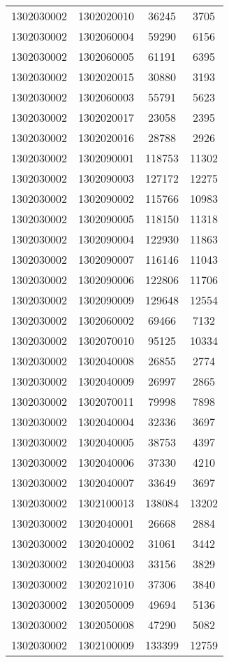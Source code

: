\begin{longtable}{llcc}
1302030002 & 1302020010 & 36245 & 3705\\
1302030002 & 1302060004 & 59290 & 6156\\
1302030002 & 1302060005 & 61191 & 6395\\
1302030002 & 1302020015 & 30880 & 3193\\
1302030002 & 1302060003 & 55791 & 5623\\
1302030002 & 1302020017 & 23058 & 2395\\
1302030002 & 1302020016 & 28788 & 2926\\
1302030002 & 1302090001 & 118753 & 11302\\
1302030002 & 1302090003 & 127172 & 12275\\
1302030002 & 1302090002 & 115766 & 10983\\
1302030002 & 1302090005 & 118150 & 11318\\
1302030002 & 1302090004 & 122930 & 11863\\
1302030002 & 1302090007 & 116146 & 11043\\
1302030002 & 1302090006 & 122806 & 11706\\
1302030002 & 1302090009 & 129648 & 12554\\
1302030002 & 1302060002 & 69466 & 7132\\
1302030002 & 1302070010 & 95125 & 10334\\
1302030002 & 1302040008 & 26855 & 2774\\
1302030002 & 1302040009 & 26997 & 2865\\
1302030002 & 1302070011 & 79998 & 7898\\
1302030002 & 1302040004 & 32336 & 3697\\
1302030002 & 1302040005 & 38753 & 4397\\
1302030002 & 1302040006 & 37330 & 4210\\
1302030002 & 1302040007 & 33649 & 3697\\
1302030002 & 1302100013 & 138084 & 13202\\
1302030002 & 1302040001 & 26668 & 2884\\
1302030002 & 1302040002 & 31061 & 3442\\
1302030002 & 1302040003 & 33156 & 3829\\
1302030002 & 1302021010 & 37306 & 3840\\
1302030002 & 1302050009 & 49694 & 5136\\
1302030002 & 1302050008 & 47290 & 5082\\
1302030002 & 1302100009 & 133399 & 12759\\

\end{longtable}
